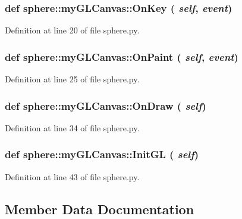 \subsubsection{\setlength{\rightskip}{0pt plus 5cm}def sphere::myGLCanvas::OnKey ( {\em self},  {\em event})}\label{classsphere_1_1myGLCanvas_68f0874c1fbebf638d8ba7dd1c245d19}




Definition at line 20 of file sphere.py.
\subsubsection{\setlength{\rightskip}{0pt plus 5cm}def sphere::myGLCanvas::OnPaint ( {\em self},  {\em event})}\label{classsphere_1_1myGLCanvas_542b7a725e6375ae673f2caaf12dd6bc}




Definition at line 25 of file sphere.py.
\subsubsection{\setlength{\rightskip}{0pt plus 5cm}def sphere::myGLCanvas::OnDraw ( {\em self})}\label{classsphere_1_1myGLCanvas_a8e9358d3cd722452e63dd0adc205191}




Definition at line 34 of file sphere.py.
\subsubsection{\setlength{\rightskip}{0pt plus 5cm}def sphere::myGLCanvas::InitGL ( {\em self})}\label{classsphere_1_1myGLCanvas_b9388c18370224e47e48092239e515ea}




Definition at line 43 of file sphere.py.

\subsection{Member Data Documentation}
\subsubsection{}\label{classsphere_1_1myGLCanvas_aa52b30c478fed9157c87982da6062e6}




